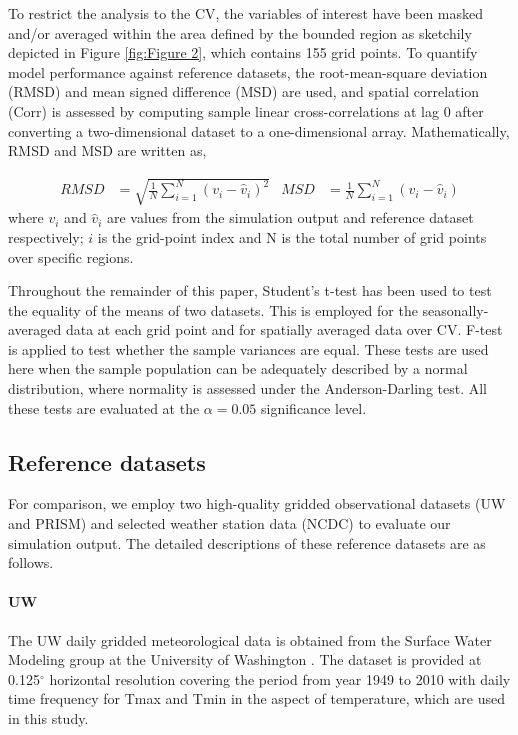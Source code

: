 \documentclass[draft,ms]{agutex}   %
\begin{document}
\begin{article}
To restrict the analysis to the CV, the variables of interest have been masked and/or averaged within the area defined by the bounded region as sketchily depicted in Figure \ref{fig:Figure 2}, which contains 155 grid points. To quantify model performance against reference datasets, the root-mean-square deviation (RMSD) and mean signed difference (MSD) are used, and spatial correlation (Corr) is assessed by computing sample linear cross-correlations at lag 0 after converting a two-dimensional dataset to a one-dimensional array. Mathematically, RMSD and MSD are written as, 

\begin{align}
RMSD &= \sqrt{\frac{1}{N} \sum_{i=1}^{N} (v_i - \hat{v}_i)^2}  & MSD &= \frac{1}{N} \sum_{i=1}^{N} (v_i - \hat{v}_i) 
\end{align} where $v_i$ and $\hat{v}_i$ are values from the simulation output and reference dataset respectively; $i$ is the grid-point index and N is the total number of grid points over specific regions.

Throughout the remainder of this paper, Student's t-test has been used to test the equality of the means of two datasets. This is employed for the seasonally-averaged data at each grid point and for spatially averaged data over CV. F-test is applied to test whether the sample variances are equal. These tests are used here when the sample population can be adequately described by a normal distribution, where normality is assessed under the Anderson-Darling test. All these tests are evaluated at the $\alpha = 0.05$ significance level. 

\subsection{Reference datasets}

For comparison, we employ two high-quality gridded observational datasets (UW and PRISM) and selected weather station data (NCDC) to evaluate our simulation output. The detailed descriptions of these reference datasets are as follows.

\paragraph{UW} The UW daily gridded meteorological data is obtained from the Surface Water Modeling group at the University of Washington \citep{maurer2002long, hamlet2005production}. The dataset is provided at 0.125$^\circ$ horizontal resolution covering the period from year 1949 to 2010 with daily time frequency for Tmax and Tmin in the aspect of temperature, which are used in this study.


\end{article}
\end{document}
